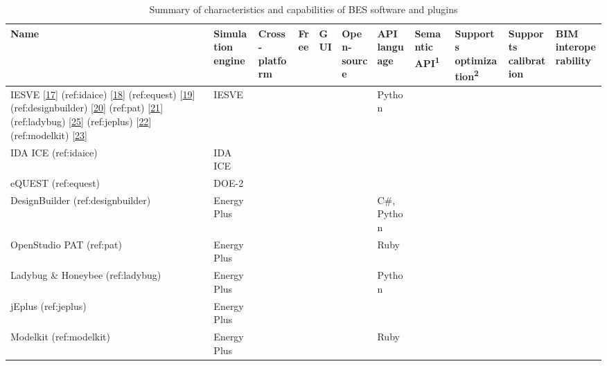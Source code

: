 \documentclass[3p, times]{elsarticle} %
\newcommand{\cmark}{\ding{51}}
\begin{document}
\begin{table}[!h]

\begin{threeparttable}
\caption{\label{tab:pat-sum}Summary of characteristics and capabilities of BES software and plugins}
\centering
\fontsize{7}{9}\selectfont
\begin{tabular}[t]{>{\raggedright\arraybackslash}p{3.2cm}>{\centering\arraybackslash}p{1.6cm}>{\centering\arraybackslash}p{1.2cm}>{\centering\arraybackslash}p{0.65cm}>{\centering\arraybackslash}p{0.65cm}>{\centering\arraybackslash}p{1.0cm}>{\centering\arraybackslash}p{1.5cm}>{\centering\arraybackslash}p{1.3cm}>{\centering\arraybackslash}p{1.6cm}>{\centering\arraybackslash}p{1.6cm}>{\centering\arraybackslash}p{1.9cm}}
\toprule
Name & Simulation engine & Cross-platform & Free & GUI & Open-source & API language & Semantic API\textsuperscript{1} & Supports optimization\textsuperscript{2} & Supports calibration & BIM interoperability\\
\midrule
IESVE {[}\protect\hyperlink{ref-IntegratedEnvironmentalSolutionsLimited2020}{17}{]} (ref:idaice)
{[}\protect\hyperlink{ref-Kalamees2004}{18}{]} (ref:equest) {[}\protect\hyperlink{ref-Hirsch2020}{19}{]} (ref:designbuilder)
{[}\protect\hyperlink{ref-DesignBuilderSoftwareLtd2020a}{20}{]} (ref:pat) {[}\protect\hyperlink{ref-Guglielmetti2011}{21}{]} (ref:ladybug)
{[}\protect\hyperlink{ref-Roudsari2013}{25}{]} (ref:jeplus) {[}\protect\hyperlink{ref-Yi2020}{22}{]} (ref:modelkit) {[}\protect\hyperlink{ref-BigLadderSoftware2020}{23}{]} & IESVE &  &  & \cmark &  & Python & \cmark & \cmark & \cmark & \cmark\\
IDA ICE (ref:idaice) & IDA ICE &  &  & \cmark &  &  &  & \cmark &  & \cmark\\
eQUEST (ref:equest) & DOE-2 &  & \cmark & \cmark &  &  &  &  &  & \\
DesignBuilder (ref:designbuilder) & EnergyPlus &  &  & \cmark &  & C\#, Python &  & \cmark &  & \cmark\\
OpenStudio PAT (ref:pat) & EnergyPlus & \cmark & \cmark & \cmark & \cmark & Ruby & \cmark & \cmark & \cmark & \cmark\\
Ladybug \& Honeybee (ref:ladybug) & EnergyPlus &  & \cmark & \cmark & \cmark & Python & \cmark &  &  & \cmark\\
jEplus (ref:jeplus) & EnergyPlus & \cmark & \cmark & \cmark & \cmark &  &  & \cmark &  & \\
Modelkit (ref:modelkit) & EnergyPlus &  & \cmark &  &  & Ruby &  &  &  & \\

\end{tabular}
\end{threeparttable}
\end{table}
\end{document}
